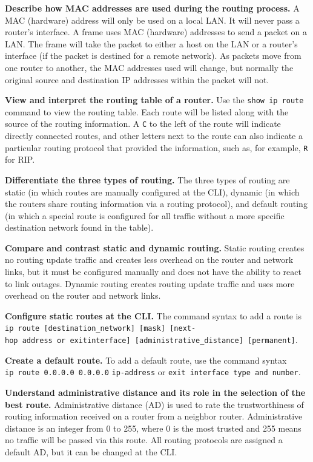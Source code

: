 \textbf{Describe how MAC addresses are used during the routing process.}
A MAC (hardware) address will only be used on a local LAN. It will never
pass a router's interface. A frame uses MAC (hardware) addresses to send
a packet on a LAN. The frame will take the packet to either a host on
the LAN or a router's interface (if the packet is destined for a remote
network). As packets move from one router to another, the MAC addresses
used will change, but normally the original source and destination IP
addresses within the packet will not.

\textbf{View and interpret the routing table of a router.} Use the
\texttt{show\ ip\ route} command to view the routing table. Each route
will be listed along with the source of the routing information. A
\texttt{C} to the left of the route will indicate directly connected
routes, and other letters next to the route can also indicate a
particular routing protocol that provided the information, such as, for
example, \texttt{R} for RIP.

\textbf{Differentiate the three types of routing.} The three types of
routing are static (in which routes are manually configured at the CLI),
dynamic (in which the routers share routing information via a routing
protocol), and default routing (in which a special route is configured
for all traffic without a more specific destination network found in the
table).

\protect\hypertarget{c09.xhtmlux5cux23Page_400}{}{}\textbf{Compare and
contrast static and dynamic routing.} Static routing creates no routing
update traffic and creates less overhead on the router and network
links, but it must be configured manually and does not have the ability
to react to link outages. Dynamic routing creates routing update traffic
and uses more overhead on the router and network links.

\textbf{Configure static routes at the CLI.} The command syntax to add a
route is
\texttt{ip\ route\ {[}destination\_network{]}\ {[}mask{]}\ {[}next-hop~address\ or\ exitinterface{]}\ {[}administrative\_distance{]}\ {[}permanent{]}}.

\textbf{Create a default route.} To add a default route, use the command
syntax \texttt{ip\ route\ 0.0.0.0\ 0.0.0.0} \texttt{ip-address} or
\texttt{exit\ interface\ type\ and\ number}.

\textbf{Understand administrative distance and its role in the selection
of the best route.} Adminis­trative distance (AD) is used to rate the
trustworthiness of routing information received on a router from a
neighbor router. Administrative distance is an integer from 0 to 255,
where 0 is the most trusted and 255 means no traffic will be passed via
this route. All routing protocols are assigned a default AD, but it can
be changed at the CLI.

